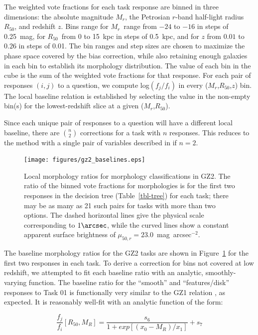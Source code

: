 \documentclass[useAMS,usenatbib]{mn2e}
\newcommand{\mr}{$M_r$}
\newcommand{\rfifty}{$R_{50}$}
\newcommand{\redshift}{$z$}
\begin{document}
The weighted vote fractions for each task response are binned in three dimensions: the absolute magnitude \mr, the Petrosian $r$-band half-light radius \rfifty, and redshift $z$. Bins range for \mr~range from $-24$ to $-16$ in steps of 0.25~mag, for \rfifty~from 0 to 15~kpc in steps of 0.5~kpc, and for $z$ from $0.01$ to $0.26$ in steps of 0.01. The bin ranges and step sizes are chosen to maximize the phase space covered by the bias correction, while also retaining enough galaxies in each bin to establish its morphology distribution. The value of each bin in the cube is the sum of the weighted vote fractions for that response. For each pair of responses $(i,j)$ to a question, we compute log$(f_j/f_i)$ in every (\mr,\rfifty,\redshift) bin. The local baseline relation is established by selecting the value in the non-empty bin(s) for the lowest-redshift slice at a given (\mr,\rfifty). 

Since each unique pair of responses to a question will have a different local baseline, there are $\binom{n}{2}$ corrections for a task with $n$ responses. This reduces to the method with a single pair of variables described in \citet{bam09} if $n=2$. 

\begin{figure}
\texttt{[image: figures/gz2\_baselines.eps]}
\caption{Local morphology ratios for morphology classifications in GZ2. The ratio of the binned vote fractions for morphologies is for the first two responses in the decision tree (Table~\ref{tbl-tree}) for each task; there may be as many as 21 such pairs for tasks with more than two options. The dashed horizontal lines give the physical scale corresponding to $1\arcsec$, while the curved lines show a constant apparent surface brightness of $\mu_{50,r}=23.0$~mag~arcsec$^{-2}$.
\label{fig-baselines}}
\end{figure}

The baseline morphology ratios for the GZ2 tasks are shown in Figure~\ref{fig-baselines} for the first two responses in each task. To derive a correction for bins not covered at low redshift, we attempted to fit each baseline ratio with an analytic, smoothly-varying function. The baseline ratio for the ``smooth'' and ``features/disk'' responses to Task 01 is functionally very similar to the GZ1 relation \citep[Figure~A5 in ][]{bam09}, as expected. It is reasonably well-fit with an analytic function of the form:

\begin{equation}
\frac{f_j}{f_i}[R_{50},M_R] = \frac{s_6}{1 + exp[(x_0 - M_R)/x_1]} + s_7
\label{eqn-sb}
\end{equation}
\end{document}
